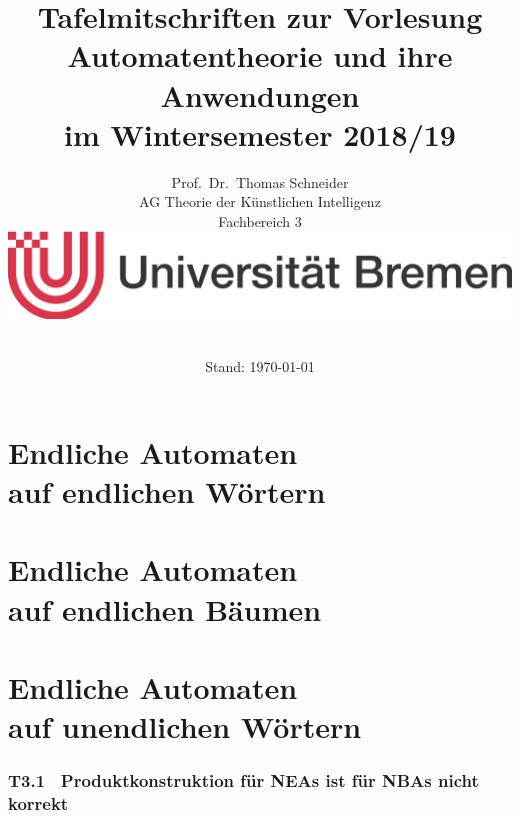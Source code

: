 \documentclass[fontsize=11pt, twoside=false, numbers=autoenddot]{scrbook}
\title{Tafelmitschriften zur Vorlesung \glqq Automatentheorie und ihre Anwendungen\grqq\\ im Wintersemester 2018/19}
\author{%
  Prof.\ Dr.\ Thomas Schneider\\[1pt]
  AG Theorie der Künstlichen Intelligenz \\[1pt]
  Fachbereich 3 \\
  \includegraphics[width=.4\linewidth]{logo_ub.jpg} \\[\baselineskip]~%
}
\date{Stand: \today}
\begin{document}
\maketitle
\tableofcontents

\part[Endliche Automaten auf endlichen Wörtern]{Endliche Automaten \\ auf endlichen Wörtern}


\part[Endliche Automaten auf endlichen Bäumen]{Endliche Automaten \\ auf endlichen Bäumen}


\part[Endliche Automaten auf unendlichen Wörtern]{Endliche Automaten \\ auf unendlichen Wörtern}

\section*{T3.1~ Produktkonstruktion für NEAs ist für NBAs nicht korrekt}
\end{document}
